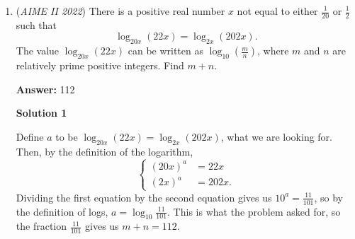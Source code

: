 \begin{enumerate}
\textbf{Solution 4 (Power of a Point)}

We know that the volume of a square pyramid is $\frac{1}{3}\cdot{s^2}\cdot{h}$. The volume of the pyramid is $54$ and the square's side length is $6$. Plugging the information back into the formula, we get

 
 \[\frac{1}{3} \cdot 6^2 \cdot h=54 \implies h=\frac{9}{2}\].

 By Pythagorean theorem, we can say the diagonal of the square is 

 
 \[\sqrt{6^2+6^2}=6\sqrt{2}\]. 

 If we draw a line going through the poles of the sphere, we can see that the line perpendicularly bisects the square's diagonal. If we take the cross-section of the sphere making the problem $2$-d, and call the radius of the sphere $r$, by the power of point, we can say

 
 \[\frac{9}{2}\cdot(2r-\frac{9}{2})=3\sqrt2\cdot{3\sqrt2}\]

 solving this equation gives you

 
 \[r=\frac{17}{4}\]

 so the answer is $17+4=\boxed{021}$. ~\href{https://artofproblemsolving.com/wiki/index.php?title=User:Lentarot}{User:Lentarot}

 


	\item (\textit{AIME II 2022}) There is a positive real number $x$ not equal to either $\frac{1}{20}$ or $\frac{1}{2}$ such that
 \[\log_{20x} (22x)=\log_{2x} (202x).\]The value $\log_{20x} (22x)$ can be written as $\log_{10} (\frac{m}{n})$, where $m$ and $n$ are relatively prime positive integers. Find $m+n$.


 
 \textbf{Answer: }112



\textbf{Solution 1}

Define $a$ to be $\log_{20x} (22x) = \log_{2x} (202x)$, what we are looking for. Then, by the definition of the logarithm,
 \[\begin{cases}  (20x)^{a} &= 22x \\ (2x)^{a} &= 202x.  \end{cases}\]Dividing the first equation by the second equation gives us $10^a = \frac{11}{101}$, so by the definition of logs, $a = \log_{10} \frac{11}{101}$. This is what the problem asked for, so the fraction $\frac{11}{101}$ gives us $m+n = \boxed{112}$.

 




\end{enumerate}
